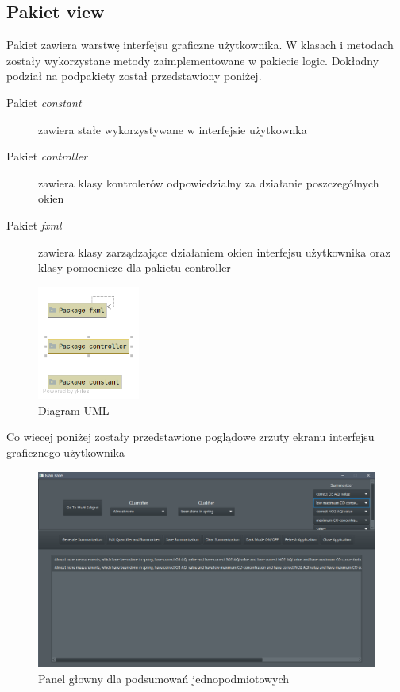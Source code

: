\documentclass{classrep}
\begin{document}
{        \subsection{Pakiet view} {
            Pakiet zawiera warstwę interfejsu graficzne użytkownika. W klasach i metodach zostały
            wykorzystane metody zaimplementowane w pakiecie logic. Dokładny podział na podpakiety
            został przedstawiony poniżej.
            \begin{description}
                \item[Pakiet \emph{constant}] zawiera stałe wykorzystywane w interfejsie użytkownka
                \item[Pakiet \emph{controller}] zawiera klasy kontrolerów odpowiedzialny za działanie poszczególnych okien
                \item[Pakiet \emph{fxml}] zawiera klasy zarządzające działaniem okien interfejsu użytkownika
                oraz klasy pomocnicze dla pakietu controller
            \end{description}
            \begin{figure}[!htbp]
                \centering
                \includegraphics[width=0.3\textwidth]{img/uml/view.png}
                \caption{Diagram UML}
            \end{figure}
            \FloatBarrier
            Co wiecej poniżej zostały przedstawione poglądowe zrzuty ekranu interfejsu
            graficznego użytkownika
            \begin{figure}[!htbp]
            \centering
            \includegraphics[width=1\textwidth]{img/gui/single_main.png}
            \caption{Panel głowny dla podsumowań jednopodmiotowych}
            \end{figure}
            \FloatBarrier

}}
\end{document}
